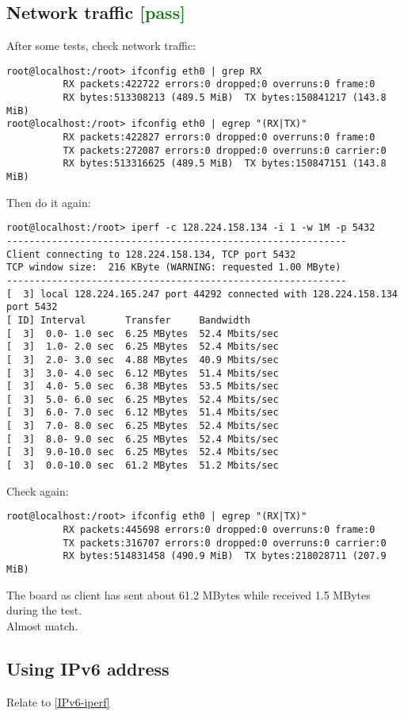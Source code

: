 \documentclass[a4paper]{report}
\begin{document}
\subsection{Network traffic \textcolor{green}{[pass]}}
After some tests, check network traffic:
\begin{lstlisting}
root@localhost:/root> ifconfig eth0 | grep RX
          RX packets:422722 errors:0 dropped:0 overruns:0 frame:0
          RX bytes:513308213 (489.5 MiB)  TX bytes:150841217 (143.8 MiB)
root@localhost:/root> ifconfig eth0 | egrep "(RX|TX)"
          RX packets:422827 errors:0 dropped:0 overruns:0 frame:0
          TX packets:272087 errors:0 dropped:0 overruns:0 carrier:0
          RX bytes:513316625 (489.5 MiB)  TX bytes:150847151 (143.8 MiB)
\end{lstlisting}
Then do it again:
\begin{lstlisting}
root@localhost:/root> iperf -c 128.224.158.134 -i 1 -w 1M -p 5432
------------------------------------------------------------
Client connecting to 128.224.158.134, TCP port 5432
TCP window size:  216 KByte (WARNING: requested 1.00 MByte)
------------------------------------------------------------
[  3] local 128.224.165.247 port 44292 connected with 128.224.158.134 port 5432
[ ID] Interval       Transfer     Bandwidth
[  3]  0.0- 1.0 sec  6.25 MBytes  52.4 Mbits/sec
[  3]  1.0- 2.0 sec  6.25 MBytes  52.4 Mbits/sec
[  3]  2.0- 3.0 sec  4.88 MBytes  40.9 Mbits/sec
[  3]  3.0- 4.0 sec  6.12 MBytes  51.4 Mbits/sec
[  3]  4.0- 5.0 sec  6.38 MBytes  53.5 Mbits/sec
[  3]  5.0- 6.0 sec  6.25 MBytes  52.4 Mbits/sec
[  3]  6.0- 7.0 sec  6.12 MBytes  51.4 Mbits/sec
[  3]  7.0- 8.0 sec  6.25 MBytes  52.4 Mbits/sec
[  3]  8.0- 9.0 sec  6.25 MBytes  52.4 Mbits/sec
[  3]  9.0-10.0 sec  6.25 MBytes  52.4 Mbits/sec
[  3]  0.0-10.0 sec  61.2 MBytes  51.2 Mbits/sec
\end{lstlisting}
Check again:
\begin{lstlisting}
root@localhost:/root> ifconfig eth0 | egrep "(RX|TX)"
          RX packets:445698 errors:0 dropped:0 overruns:0 frame:0
          TX packets:316707 errors:0 dropped:0 overruns:0 carrier:0
          RX bytes:514831458 (490.9 MiB)  TX bytes:218028711 (207.9 MiB)
\end{lstlisting}
The board as client has sent about 61.2 MBytes while received 1.5 MBytes during the test.\\
Almost match.
\subsection{Using IPv6 address}
Relate to \ref{IPv6-iperf}
\end{document}
